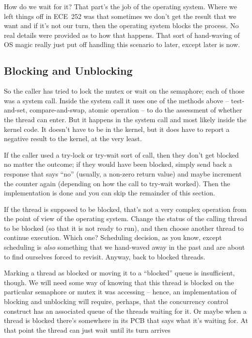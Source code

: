 How do we wait for it? That part's the job of the operating system. Where we left things off in ECE~252 was that sometimes we don't get the result that we want and if it's not our turn, then the operating system blocks the process. No real details were provided as to how that happens. That sort of hand-waving of OS magic really just put off handling this scenario to later, except later is now.

\subsection*{Blocking and Unblocking}

So the caller has tried to lock the mutex or wait on the semaphore; each of those was a system call. Inside the system call it uses one of the methods above -- test-and-set, compare-and-swap, atomic operation -- to do the assessment of whether the thread can enter. But it happens in the system call and most likely inside the kernel code. It doesn't have to be in the kernel, but it does have to report a negative result to the kernel, at the very least.

If the caller used a try-lock or try-wait sort of call, then they don't get blocked no matter the outcome; if they would have been blocked, simply send back a response that says ``no'' (usually, a non-zero return value) and maybe increment the counter again (depending on how the call to try-wait worked). Then the implementation is done and you can skip the remainder of this section. 

If the thread is supposed to be blocked, that's not a very complex operation from the point of view of the operating system. Change the status of the calling thread to be blocked (so that it is not ready to run), and then choose another thread to continue execution. Which one? Scheduling decision, as you know, except scheduling is \textit{also} something that we hand-waved away in the past and are about to find ourselves forced to revisit. Anyway, back to blocked threads.  

Marking a thread as blocked or moving it to a ``blocked'' queue is insufficient, though. We will need some way of knowing that this thread is blocked on the particular semaphore or mutex it was accessing -- hence, an implementation of blocking and unblocking will require, perhaps, that the concurrency control construct has an associated queue of the threads waiting for it. Or maybe when a thread is blocked there's somewhere in its PCB that says what it's waiting for. At that point the thread can just wait until its turn arrives

